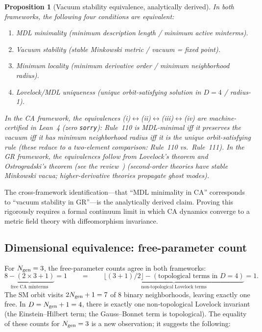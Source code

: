 \documentclass[11pt]{article}
\newtheorem{proposition}[theorem]{Proposition}
\theoremstyle{remark}
\newcommand{\CatAL}{machine-certified in Lean~4 (zero \texttt{sorry})}
\newcommand{\CatAD}{analytically derived}
\newcommand{\Ngen}{N_{\rm gen}}
\begin{document}
\begin{proposition}[Vacuum stability equivalence, \CatAD]
\label{prop:vac_stability}
In both frameworks, the following four conditions are equivalent:
\begin{enumerate}[label=(\roman*),leftmargin=2em]
  \item MDL minimality (minimum description length / minimum active minterms).
  \item Vacuum stability (stable Minkowski metric / vacuum = fixed point).
  \item Minimum locality (minimum derivative order / minimum neighborhood radius).
  \item Lovelock/MDL uniqueness (unique orbit-satisfying solution in $D = 4$ / radius-1).
\end{enumerate}
In the CA framework, the equivalences (i)$\leftrightarrow$(ii)$\leftrightarrow$(iii)$\leftrightarrow$(iv)
are \CatAL: Rule~110 is MDL-minimal iff it preserves the vacuum iff it has
minimum neighborhood radius iff it is the unique orbit-satisfying rule
(these reduce to a two-element comparison: Rule~110 vs.\ Rule~111).
In the GR framework, the equivalences follow from Lovelock's theorem and
Ostrogradski's theorem (see the review~\cite{Woodard2015})
(second-order theories have stable Minkowski vacua; higher-derivative
theories propagate ghost modes).
\end{proposition}

The cross-framework identification---that ``MDL minimality in CA'' corresponds
to ``vacuum stability in GR''---is the analytically derived claim.
Proving this rigorously requires a formal continuum limit in which CA
dynamics converge to a metric field theory with diffeomorphism invariance.

\subsection{Dimensional equivalence: free-parameter count}
\label{ssec:dim_equiv}

For $\Ngen = 3$, the free-parameter counts agree in both frameworks:
\begin{equation}
  \underbrace{8 - (2 \times 3 + 1)}_{\text{free CA minterms}} = 1
  \qquad = \qquad
  \underbrace{\bigl\lfloor (3+1)/2 \bigr\rfloor - (\text{topological terms in } D=4)}_{\text{non-topological Lovelock terms}} = 1.
  \label{eq:free_count}
\end{equation}
The SM orbit visits $2\Ngen + 1 = 7$ of 8 binary neighborhoods, leaving
exactly one free.
In $D = \Ngen + 1 = 4$, there is exactly one non-topological Lovelock
invariant (the Einstein--Hilbert term; the Gauss--Bonnet term is topological).
The equality of these counts for $\Ngen = 3$ is a new observation; it
suggests the following:
\end{document}
